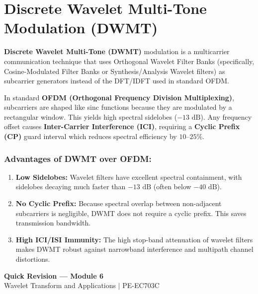 \documentclass[12pt,a4paper]{article}
\begin{document}
\section{Discrete Wavelet Multi-Tone Modulation (DWMT)}

\begin{tcolorbox}[defbox, title={\textbf{Definition of DWMT}}]
\textbf{Discrete Wavelet Multi-Tone (DWMT)} modulation is a multicarrier communication technique that uses Orthogonal Wavelet Filter Banks (specifically, Cosine-Modulated Filter Banks or Synthesis/Analysis Wavelet filters) as subcarrier generators instead of the DFT/IDFT used in standard OFDM.
\end{tcolorbox}

In standard \textbf{OFDM (Orthogonal Frequency Division Multiplexing)}, subcarriers are shaped like sinc functions because they are modulated by a rectangular window. This yields high spectral sidelobes ($-13\text{ dB}$). Any frequency offset causes \textbf{Inter-Carrier Interference (ICI)}, requiring a \textbf{Cyclic Prefix (CP)} guard interval which reduces spectral efficiency by $10\text{--}25\%$.

\subsubsection{Advantages of DWMT over OFDM:}
\begin{enumerate}[leftmargin=*, itemsep=4pt]
  \item \textbf{Low Sidelobes:} Wavelet filters have excellent spectral containment, with sidelobes decaying much faster than $-13\text{ dB}$ (often below $-40\text{ dB}$).
  \item \textbf{No Cyclic Prefix:} Because spectral overlap between non-adjacent subcarriers is negligible, DWMT does not require a cyclic prefix. This saves transmission bandwidth.
  \item \textbf{High ICI/ISI Immunity:} The high stop-band attenuation of wavelet filters makes DWMT robust against narrowband interference and multipath channel distortions.
\end{enumerate}

\newpage
\begin{center}
  {\large\bfseries\color{myred} Quick Revision --- Module 6}\\[3pt]
  {\small\color{mydark} Wavelet Transform and Applications $|$ PE-EC703C}
\end{center}
\noindent{\color{myred}\rule{\linewidth}{1.2pt}}
\vspace{4pt}
\end{document}
